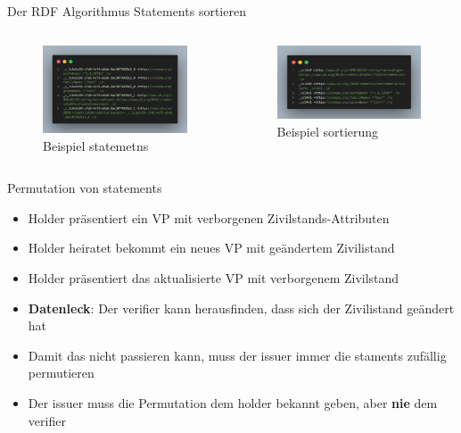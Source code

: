 \documentclass[
	german,%
	authorontitle=true,
	]{bfhbeamer}
\begin{document}
\begin{frame}{Der RDF Algorithmus}
    \centering
    Statements sortieren
    \begin{columns}[onlytextwidth,T]
        \column{70mm}  
        \begin{figure}
            \centering
            \includegraphics[width=70mm]{../img/statements.png}
            \caption{Beispiel statemetns}
        \end{figure}

        \column{70mm}  
        \begin{figure}
            \centering
            \includegraphics[width=70mm]{../img/hashed.png}
            \caption{Beispiel sortierung}
        \end{figure}
    \end{columns}
\end{frame}

\begin{frame}{Permutation von statements}
    \begin{itemize}
        \item Holder präsentiert ein VP mit verborgenen Zivilstands-Attributen
        \item Holder heiratet bekommt ein neues VP mit geändertem Zivilistand
        \item Holder präsentiert das aktualisierte VP mit verborgenem Zivilstand
        \item \textbf{Datenleck}: Der verifier kann herausfinden, dass sich der Zivilistand geändert hat
        \item Damit das nicht passieren kann, muss der issuer immer die staments zufällig permutieren
        \item Der issuer muss die Permutation dem holder bekannt geben, aber \textbf{nie} dem verifier
    \end{itemize}
\end{frame}
\end{document}
